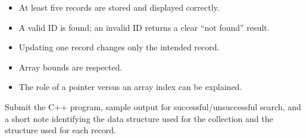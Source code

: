 \begin{verification}
\begin{itemize}
  \item At least five records are stored and displayed correctly.
  \item A valid ID is found; an invalid ID returns a clear ``not found'' result.
  \item Updating one record changes only the intended record.
  \item Array bounds are respected.
  \item The role of a pointer versus an array index can be explained.
\end{itemize}
\end{verification}

\begin{labdeliverable}
Submit the C++ program, sample output for successful/unsuccessful search, and a short note identifying the data structure used for the collection and the structure used for each record.
\end{labdeliverable}

